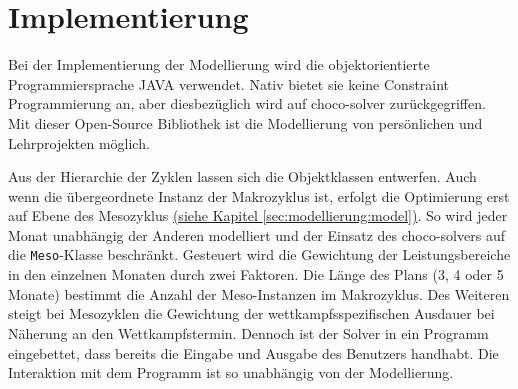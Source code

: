 \chapter{Implementierung}
\label{sec:implementierung} 
Bei der Implementierung der Modellierung wird die objektorientierte Programmiersprache JAVA \cite{java} verwendet. Nativ bietet sie keine Constraint Programmierung an, aber diesbezüglich wird auf choco-solver \cite{ChocoSolverWeb} zurückgegriffen. Mit dieser Open-Source Bibliothek ist die Modellierung von persönlichen und Lehrprojekten möglich. \par
Aus der Hierarchie der Zyklen lassen sich die Objektklassen entwerfen. Auch wenn die übergeordnete Instanz der Makrozyklus ist, erfolgt die Optimierung erst auf Ebene des Mesozyklus \hyperref[sec:modellierung:model]{(siehe Kapitel \ref{sec:modellierung:model})}. So wird jeder Monat unabhängig der Anderen modelliert und der Einsatz des choco-solvers auf die \texttt{Meso}-Klasse beschränkt. Gesteuert wird die Gewichtung der Leistungsbereiche in den einzelnen Monaten durch zwei Faktoren. Die Länge des Plans (3, 4 oder 5 Monate) bestimmt die Anzahl der Meso-Instanzen im Makrozyklus. Des Weiteren steigt bei Mesozyklen die Gewichtung der wettkampfsspezifischen Ausdauer bei Näherung an den Wettkampfstermin.
Dennoch ist der Solver in ein Programm eingebettet, dass bereits die Eingabe und Ausgabe des Benutzers handhabt. Die Interaktion mit dem Programm ist so unabhängig von der Modellierung. \par

